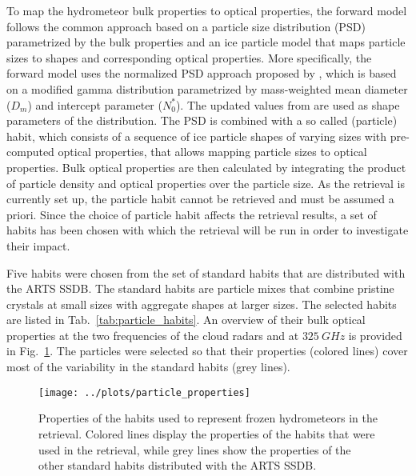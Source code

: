 \documentclass[journal abbreviation, manuscript]{copernicus}
\begin{document}
To map the hydrometeor bulk properties to optical properties, the forward model
follows the common approach based on a particle size distribution (PSD)
parametrized by the bulk properties and an ice particle model that maps particle
sizes to shapes and corresponding optical properties. More specifically, the
forward model uses the normalized PSD approach proposed by \citet{delanoe05},
which is based on a modified gamma distribution parametrized by mass-weighted
mean diameter ($D_m$) and intercept parameter ($N_0^*$). The updated values from
\citet{cazenave19} are used as shape parameters of the distribution. The PSD is
combined with a so called (particle) habit, which consists of a sequence of ice
particle shapes of varying sizes with pre-computed optical properties, that
allows mapping particle sizes to optical properties. Bulk optical properties are
then calculated by integrating the product of particle density and optical
properties over the particle size. As the retrieval is currently set up, the
particle habit cannot be retrieved and must be assumed a priori. Since the
choice of particle habit affects the retrieval results, a set of habits has been
chosen with which the retrieval will be run in order to investigate their
impact.

Five habits were chosen from the set of standard habits that are distributed
with the ARTS SSDB. The standard habits are particle mixes that combine pristine
crystals at small sizes with aggregate shapes at larger sizes. The selected
habits are listed in Tab.~\ref{tab:particle_habits}. An overview of their bulk
optical properties at the two frequencies of the cloud radars and at
$325\ \unit{GHz}$ is provided in Fig.~\ref{fig:particle_properties}. The
particles were selected so that their properties (colored lines) cover most of
the variability in the standard habits (grey lines).

\begin{figure}[hbpt!]
  \centering
  \texttt{[image: ../plots/particle\_properties]}
  \caption{Properties of the habits used to represent frozen hydrometeors
    in the retrieval. Colored lines display the properties of the habits that
    were used in the retrieval, while grey lines show the properties of the
    other standard habits distributed with the ARTS SSDB.
    }
  \label{fig:particle_properties}
\end{figure}
\end{document}
